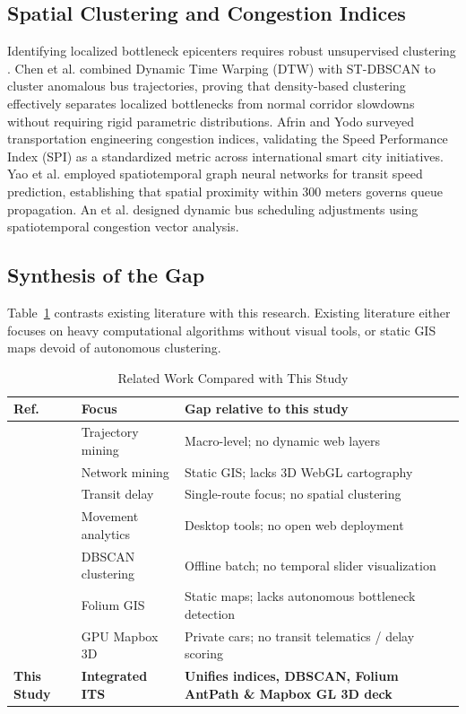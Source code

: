 \documentclass[conference]{IEEEtran}
\begin{document}
\subsection{Spatial Clustering and Congestion Indices}
Identifying localized bottleneck epicenters requires robust unsupervised clustering \cite{chen2022urban}. Chen et al. \cite{chen2022urban} combined Dynamic Time Warping (DTW) with ST-DBSCAN to cluster anomalous bus trajectories, proving that density-based clustering effectively separates localized bottlenecks from normal corridor slowdowns without requiring rigid parametric distributions. Afrin and Yodo \cite{afrin2020survey} surveyed transportation engineering congestion indices, validating the Speed Performance Index (SPI) as a standardized metric across international smart city initiatives. Yao et al. \cite{yao2021spatiotemporal} employed spatiotemporal graph neural networks for transit speed prediction, establishing that spatial proximity within 300 meters governs queue propagation. An et al. \cite{an2021dynamic} designed dynamic bus scheduling adjustments using spatiotemporal congestion vector analysis.

\subsection{Synthesis of the Gap}
Table~\ref{tab:related_work} contrasts existing literature with this research. Existing literature either focuses on heavy computational algorithms without visual tools, or static GIS maps devoid of autonomous clustering.

\begin{table}[h]
\caption{Related Work Compared with This Study}
\centering
\begin{tabular}{@{}llp{4.2cm}@{}}
\toprule
\textbf{Ref.} & \textbf{Focus} & \textbf{Gap relative to this study} \\
\midrule
\cite{zheng2015trajectory, wang2021spatiotemporal} & Trajectory mining & Macro-level; no dynamic web layers \\
\cite{tang2016network} & Network mining & Static GIS; lacks 3D WebGL cartography \\
\cite{sun2014predicting, mazloumi2010using} & Transit delay & Single-route focus; no spatial clustering \\
\cite{andrienko2017visual, ferreira2013visual} & Movement analytics & Desktop tools; no open web deployment \\
\cite{chen2022urban} & DBSCAN clustering & Offline batch; no temporal slider visualization \\
\cite{giesen2019interactive} & Folium GIS & Static maps; lacks autonomous bottleneck detection \\
\cite{zhang2023mining} & GPU Mapbox 3D & Private cars; no transit telematics / delay scoring \\
\textbf{This Study} & \textbf{Integrated ITS} & \textbf{Unifies indices, DBSCAN, Folium AntPath \& Mapbox GL 3D deck} \\
\bottomrule
\end{tabular}
\label{tab:related_work}
\end{table}
\end{document}

